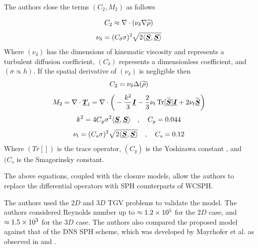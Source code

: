 The authors close the terms $(C_2, M_2)$ as follows

\begin{equation}
    C_2 \approx \nabla \cdot (\nu_{\delta} \nabla\widetilde{\rho})
\end{equation}
\begin{equation}
    \nu_{\delta} = (C_{\delta}\sigma)^2\sqrt{2\langle \underline{\bm{S}}, \underline{\bm{S}} \rangle}
\end{equation}
Where $(\nu_{\delta})$ has the dimensions of kinematic viscosity and represents a turbulent diffusion coefficient, $(C_{\delta})$ represents a dimensionless coefficient, and $(\sigma \propto h)$. If the spatial derivative of $(\nu_{\delta})$ is negligible then
\begin{equation}
    C_2 = \nu_{\delta} \Delta(\widetilde{\rho})
\end{equation}
\begin{equation}
    M_2 = \nabla \cdot \underline{\bm{T}}_l = \nabla \cdot \bigg( -\frac{k^2}{3}\underline{\bm{I}} - \frac{2}{3}\nu_t \operatorname{Tr}[\widetilde{\underline{\bm{S}}}]\underline{\bm{I}} + 2\nu_t\widetilde{\underline{\bm{S}}} \bigg)
\end{equation}
\begin{equation}
    k^2 = 4 C_y \sigma^2 \langle \underline{\bm{S}}, \underline{\bm{S}} \rangle \quad , \quad C_y=0.044
\end{equation}
\begin{equation}
    \nu_t = (C_s\sigma)^2\sqrt{2 \langle \underline{\bm{S}}, \underline{\bm{S}} \rangle} \quad , \quad C_s=0.12
\end{equation}
Where $(Tr[])$ is the trace operator, $(C_y)$ is the Yoshizawa constant \parencite{yoshizawa1986statistical}, and $(C_s$ is the Smagorinsky constant.

The above equations, coupled with the closure models, allow the authors to replace the differential operators with SPH counterparts of WCSPH.

The authors used the  $2D$ and $3D$ TGV problems to validate the model. The authors considered Reynolds number up to $\approx 1.2 \times {10}^{5}$ for the $2D$ case, and $\approx 1.5 \times {10}^{3}$ for the $3D$ case. The authors also compared the proposed model against that of the DNS SPH scheme, which was developed by Mayrhofer et al. \parencite{mayrhofer2015dns} as observed in  and .

